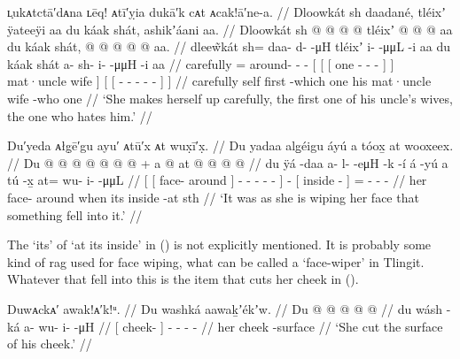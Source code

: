 \ex\label{ex:90-84-makes-herself-up}%
%
\begingl
	\glpreamble	ʟ̣ukᴀtctā′dᴀna ʟēq! ᴀtī′ỵia dukā′k cᴀt ᴀcak!ā′ne-a. //
	\glpreamble	Dloowkát sh daadané, tléixʼ ÿateeÿi aa du káak shát, ashikʼáani aa. //
	\gla	Dloowkát
		sh @  @ {} @ {} @ {}
		{} {} {} tléixʼ  @ {} @ {} @ {} {} aa {}
			du káak shát, {}
		{} {}  @ {} @ {} @ {} @ {} @ {} {} aa. {} //
	\glb	dleew̃kát
		sh= daa- d-  -μH
		{} {} {} tléixʼ i-  -μμL -i {} aa {}
			du káak shát {}
		{} {} a- sh- i-  -μμH -i {} aa {} //
	\glc	carefully
		= around- -  -
		{}[ {}[ {}[ one -  - - {}]  {}]
			 mat·uncle wife {}]
		{}[ {}[ - - -  - - {}]  {}] //
	\gld	carefully
		self  {} {} {}
		{} {} {} first  {} {} -which {} one {}
			his mat·uncle wife {}
		{} {}  {} {} {} {} -who {} one {} //
	\glft	‘She makes herself up carefully, the first one of his uncle’s wives, the one who hates him.’
		//
\endgl
\xe

\ex\label{ex:90-85-wipe-face-fall}%
%
\begingl
	\glpreamble	Du′yeda ᴀłg̣ē′gu ayu′ ᴀtū′x ᴀt wux̣ī′x̣. //
	\glpreamble	Du yadaa alg̱éigu áyú a tóox̱ at wooxeex. //
	\gla	{} {} Du  @ {} {}
			 @ {} @ {} @ {} @ {} @ {} {}
		 @ {} +
		{} a  @ {} {}
		at @  @ {} @ {} @ {} //
	\glb	{} {} du ÿá -daa {}
			a- l-  -eμH -k -í {}
		á -yú
		{} a tú -x̱ {}
		at= wu- i-  -μμL //
	\glc	{}[ {}[  face- around {}]
			- -  - - - {}]
		 -
		{}[  inside - {}]
		= - -  - //
	\gld	{} {} her face- around {}
			 {} {} {} {} \·when {}  {}
		{} its inside -at {} sth\•  {} {} {} //
	\glft	‘It was as she is wiping her face that something fell into it.’
		//
\endgl
\xe

The  ‘its’ of  ‘at its inside’ in (\lastx) is not explicitly mentioned.
It is probably some kind of rag used for face wiping, what can be called a  ‘face-wiper’ in Tlingit.
Whatever that fell into this is the item that cuts her cheek in (\nextx).

\ex\label{ex:90-86-cut-cheek}%
%
\begingl
	\glpreamble	Duwᴀckᴀ′ awak!ᴀ′k!ᵘ. //
	\glpreamble	Du washká aawaḵʼékʼw. //
	\gla	{} Du  @ {} {}
		 @ {} @ {} @ {} @ {} //
	\glb	{} du wásh -ká {}
		a- wu- i-  -μH //
	\glc	{}[  cheek-  {}]
		- - -  - //
	\gld	{} her cheek -surface {}
		 {} {} {} {} //
	\glft	‘She cut the surface of his cheek.’
		//
\endgl
\xe

